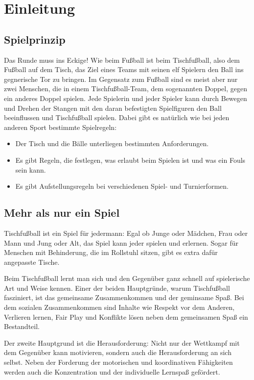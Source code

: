 \chapter{Einleitung}
\label{einleitung}

\section{Spielprinzip}
\label{einleitung:prinzip}

Das Runde muss ins Eckige! Wie beim Fußball ist beim Tischfußball, also dem Fußball auf dem Tisch, das Ziel eines Teams mit seinen elf Spielern den Ball ins gegnerische Tor zu bringen.  
Im Gegensatz zum Fußball sind es meist aber nur zwei Menschen, die in einem Tischfußball-Team, dem sogenannten Doppel, gegen ein anderes Doppel spielen.
Jede Spielerin und jeder Spieler kann durch Bewegen und Drehen der Stangen mit den daran befestigten Spielfiguren den Ball beeinflussen und Tischfußball spielen.
Dabei gibt es natürlich wie bei jeden anderen Sport bestimmte Spielregeln:
\begin{itemize}
\item Der Tisch und die Bälle unterliegen bestimmten Anforderungen.
\item Es gibt Regeln, die festlegen, was erlaubt beim Spielen ist und was ein Fouls sein kann.
\item Es gibt Aufstellungsregeln bei verschiedenen Spiel- und Turnierformen. 
\end{itemize}


\section{Mehr als nur ein Spiel}
\label{einleitung:spiel}

Tischfußball ist ein Spiel für jedermann: Egal ob Junge oder Mädchen, Frau oder Mann und Jung oder Alt, das Spiel kann jeder spielen und erlernen. Sogar für Menschen mit Behinderung, die im Rollstuhl sitzen, gibt es extra dafür angepasste Tische. 

Beim Tischfußball lernt man sich und den Gegenüber ganz schnell auf spielerische Art und Weise kennen. 
Einer der beiden Hauptgründe, warum Tischfußball fasziniert, ist das gemeinsame Zusammenkommen und der geminsame Spaß. 
Bei dem sozialen Zusammenkommen sind Inhalte wie Respekt vor dem Anderen, Verlieren lernen, Fair Play und Konflikte lösen neben dem gemeinsamen Spaß ein Bestandteil. 

Der zweite Hauptgrund ist die Herausforderung: Nicht nur der Wettkampf mit dem Gegenüber kann motivieren, sondern auch die Herausforderung an sich selbst.
Neben der Forderung der motorischen und koordinativen Fähigkeiten werden auch die Konzentration und der individuelle Lernspaß gefördert.       

